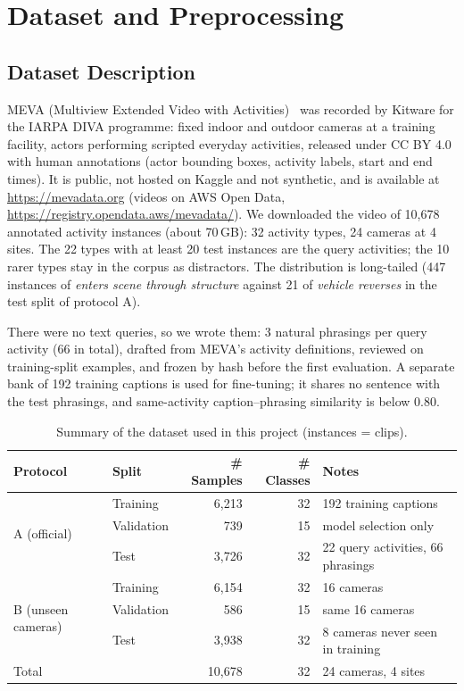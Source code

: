 \documentclass[11pt,a4paper]{article}
\newcommand{\act}[1]{\textit{#1}}
\begin{document}
\section{Dataset and Preprocessing}\label{sec:data}

\subsection{Dataset Description}
MEVA (Multiview Extended Video with Activities)~\cite{meva} was recorded by Kitware for the IARPA DIVA programme:
fixed indoor and outdoor cameras at a training facility, actors performing scripted everyday activities, released
under CC BY 4.0 with human annotations (actor bounding boxes, activity labels, start and end times). It is public,
not hosted on Kaggle and not synthetic, and is available at \url{https://mevadata.org} (videos on AWS Open Data,
\url{https://registry.opendata.aws/mevadata/}). We downloaded the video of 10,678 annotated activity instances (about
70\,GB): 32 activity types, 24 cameras at 4 sites. The 22 types with at least 20 test instances are the query
activities; the 10 rarer types stay in the corpus as distractors. The distribution is long-tailed (447 instances
of \act{enters scene through structure} against 21 of \act{vehicle reverses} in the test split of protocol A).

There were no text queries, so we wrote them: 3 natural phrasings per query activity (66 in total), drafted from
MEVA's activity definitions, reviewed on training-split examples, and frozen by hash before the first evaluation.
A separate bank of 192 training captions is used for fine-tuning; it shares no sentence with the test phrasings,
and same-activity caption--phrasing similarity is below 0.80.

\begin{table}[H]
\centering
\caption[Summary of the dataset used in this project.]{Summary of the dataset used in this project (instances = clips).}\label{tab:data}
\small
\begin{tabular}{llrrl}
\toprule
\textbf{Protocol} & \textbf{Split} & \textbf{\# Samples} & \textbf{\# Classes} & \textbf{Notes} \\
\midrule
\multirow{3}{*}{A (official)} & Training   & 6,213 & 32 & 192 training captions \\
                              & Validation &   739 & 15 & model selection only \\
                              & Test       & 3,726 & 32 & 22 query activities, 66 phrasings \\
\midrule
\multirow{3}{*}{B (unseen cameras)} & Training   & 6,154 & 32 & 16 cameras \\
                                    & Validation &   586 & 15 & same 16 cameras \\
                                    & Test       & 3,938 & 32 & 8 cameras never seen in training \\
\midrule
\multicolumn{2}{l}{Total} & 10,678 & 32 & 24 cameras, 4 sites \\
\bottomrule
\end{tabular}
\end{table}
\end{document}
